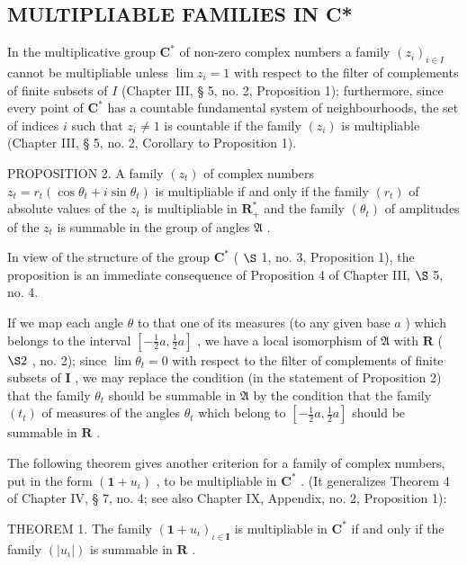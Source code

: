\subsection{MULTIPLIABLE FAMILIES IN C*}

In the multiplicative group \(\mathbf{C}^*\) of non-zero complex numbers a family \((z_{i})_{i\in I}\) cannot be multipliable unless \(\lim z_{i} = 1\) with respect to the filter of complements of finite subsets of \(I\) (Chapter III, § 5, no. 2, Proposition 1); furthermore, since every point of \(\mathbf{C}^*\) has a countable fundamental system of neighbourhoods, the set of indices \(i\) such that \(z_{i}\neq 1\) is countable if the family \((z_{i})\) is multipliable (Chapter III, § 5, no. 2, Corollary to Proposition 1).

PROPOSITION 2. A family \((z_{t})\) of complex numbers \(z_{t} = r_{t}(\cos \theta_{t} + i\sin \theta_{t})\) is multipliable if and only if the family \((r_{t})\) of absolute values of the \(z_{t}\) is multipliable in \(\mathbf{R}_{+}^{*}\) and the family \((\theta_{t})\) of amplitudes of the \(z_{t}\) is summable in the group of angles \(\mathfrak{A}\) .

In view of the structure of the group \(\mathbf{C}^*\) ( \(\S\) 1, no. 3, Proposition 1), the proposition is an immediate consequence of Proposition 4 of Chapter III, \(\S\) 5, no. 4.

If we map each angle \(\theta\) to that one of its measures (to any given base \(a\) ) which belongs to the interval \([- \frac{1}{2} a, \frac{1}{2} a]\) , we have a local isomorphism of \(\mathfrak{A}\) with \(\mathbf{R}\) ( \(\S 2\) , no. 2); since \(\lim \theta_{t} = 0\) with respect to the filter of complements of finite subsets of \(\mathbf{I}\) , we may replace the condition (in the statement of Proposition 2) that the family \(\theta_t\) should be summable in \(\mathfrak{A}\) by the condition that the family \((t_t)\) of measures of the angles \(\theta_t\) which belong to \([- \frac{1}{2} a, \frac{1}{2} a]\) should be summable in \(\mathbf{R}\) .

The following theorem gives another criterion for a family of complex numbers, put in the form \((\mathbf{1} + u_{\iota})\) , to be multipliable in \(\mathbf{C}^*\) . (It generalizes Theorem 4 of Chapter IV, § 7, no. 4; see also Chapter IX, Appendix, no. 2, Proposition 1):

THEOREM 1. The family \((\mathbf{1} + u_{\iota})_{\iota \in \mathbf{I}}\) is multipliable in \(\mathbf{C}^*\) if and only if the family \((|u_{\iota}|)\) is summable in \(\mathbf{R}\) .

